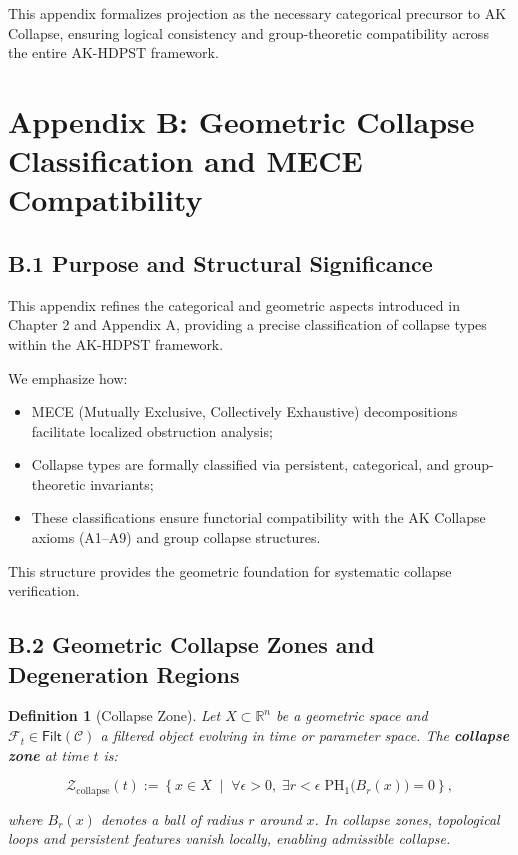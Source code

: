 \documentclass[11pt]{article}
\newtheorem{definition}[theorem]{Definition}
\begin{document}
This appendix formalizes projection as the necessary categorical precursor to AK Collapse, ensuring logical consistency and group-theoretic compatibility across the entire AK-HDPST framework.



\section*{Appendix B: Geometric Collapse Classification and MECE Compatibility}

\subsection*{B.1 Purpose and Structural Significance}

This appendix refines the categorical and geometric aspects introduced in Chapter 2 and Appendix A, providing a precise classification of collapse types within the AK-HDPST framework.

We emphasize how:

\begin{itemize}
    \item MECE (Mutually Exclusive, Collectively Exhaustive) decompositions facilitate localized obstruction analysis;
    \item Collapse types are formally classified via persistent, categorical, and group-theoretic invariants;
    \item These classifications ensure functorial compatibility with the AK Collapse axioms (A1–A9) and group collapse structures.
\end{itemize}

This structure provides the geometric foundation for systematic collapse verification.

\subsection*{B.2 Geometric Collapse Zones and Degeneration Regions}

\begin{definition}[Collapse Zone]
Let \( X \subset \mathbb{R}^n \) be a geometric space and \( \mathcal{F}_t \in \mathsf{Filt}(\mathcal{C}) \) a filtered object evolving in time or parameter space. The \textbf{collapse zone} at time \( t \) is:

\[
\mathcal{Z}_{\mathrm{collapse}}(t) := \left\{ x \in X \;\middle|\; \forall \epsilon > 0, \; \exists r < \epsilon \; \mathrm{PH}_1\big(B_r(x)\big) = 0 \right\},
\]

where \( B_r(x) \) denotes a ball of radius \( r \) around \( x \). In collapse zones, topological loops and persistent features vanish locally, enabling admissible collapse.

\end{definition}
\end{document}
